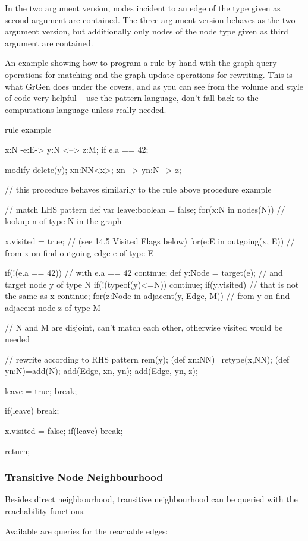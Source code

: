 In the two argument version, nodes incident to an edge of the type given as second argument are contained.
The three argument version behaves as the two argument version, but additionally only nodes of the node type given as third argument are contained.

\begin{example}
An example showing how to program a rule by hand with the graph query operations for matching and the graph update operations for rewriting. This is what GrGen does under the covers, and as you can see from the volume and style of code very helpful -- use the pattern language, don't fall back to the computations language unless really needed.
\begin{grgen}
rule example
{
	x:N -e:E-> y:N <--> z:M;
	if { e.a == 42; }

	modify {
		delete(y);
		xn:NN<x>;
		xn --> yn:N --> z;
	}
}
// this procedure behaves similarily to the rule above
procedure example
{
	// match LHS pattern
	def var leave:boolean = false;
	for(x:N in nodes(N)) // lookup n of type N in the graph
	{
		x.visited = true; // (see 14.5 Visited Flags below)
		for(e:E in outgoing(x, E)) // from x on find outgoing edge e of type E
		{
			if(!(e.a == 42)) { // with e.a == 42
				continue;
			}
			def y:Node = target(e); // and target node y of type N
			if(!(typeof(y)<=N)) {
				continue;
			}
			if(y.visited) { // that is not the same as x
				continue;
			}
			for(z:Node in adjacent(y, Edge, M)) // from y on find adjacent node z of type M
			{ // N and M are disjoint, can't match each other, otherwise visited would be needed
			
				// rewrite according to RHS pattern
				rem(y);
				(def xn:NN)=retype(x,NN);
				(def yn:N)=add(N);
				add(Edge, xn, yn);
				add(Edge, yn, z);

				leave = true; break;
			}
			if(leave) { break; }
		}
		x.visited = false;
		if(leave) { break; }
	}
	return;
}
\end{grgen}
\end{example}

\subsubsection*{Transitive Node Neighbourhood}\label{transitiveneighbour}

Besides direct neighbourhood, transitive neighbourhood can be queried with the reachability functions.

Available are queries for the reachable edges:

